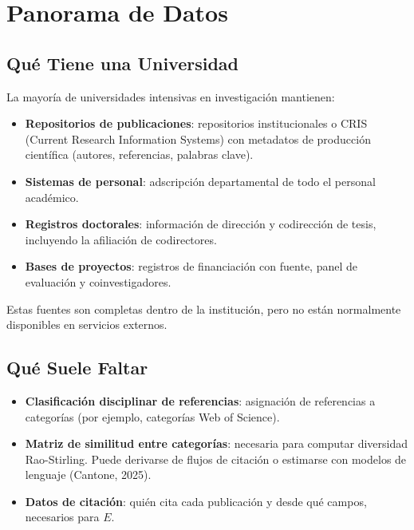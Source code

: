 \documentclass[
]{article}
\providecommand{\tightlist}{%
  \setlength{\itemsep}{0pt}\setlength{\parskip}{0pt}}
\begin{document}
\hypertarget{panorama-de-datos}{%
\section{Panorama de Datos}\label{panorama-de-datos}}

\hypertarget{quuxe9-tiene-una-universidad}{%
\subsection{Qué Tiene una
Universidad}\label{quuxe9-tiene-una-universidad}}

La mayoría de universidades intensivas en investigación mantienen:

\begin{itemize}
\tightlist
\item
  \textbf{Repositorios de publicaciones}: repositorios institucionales o
  CRIS (Current Research Information Systems) con metadatos de
  producción científica (autores, referencias, palabras clave).
\item
  \textbf{Sistemas de personal}: adscripción departamental de todo el
  personal académico.
\item
  \textbf{Registros doctorales}: información de dirección y codirección
  de tesis, incluyendo la afiliación de codirectores.
\item
  \textbf{Bases de proyectos}: registros de financiación con fuente,
  panel de evaluación y coinvestigadores.
\end{itemize}

Estas fuentes son completas dentro de la institución, pero no están
normalmente disponibles en servicios externos.

\hypertarget{quuxe9-suele-faltar}{%
\subsection{Qué Suele Faltar}\label{quuxe9-suele-faltar}}

\begin{itemize}
\tightlist
\item
  \textbf{Clasificación disciplinar de referencias}: asignación de
  referencias a categorías (por ejemplo, categorías Web of Science).
\item
  \textbf{Matriz de similitud entre categorías}: necesaria para computar
  diversidad Rao-Stirling. Puede derivarse de flujos de citación o
  estimarse con modelos de lenguaje (Cantone, 2025).
\item
  \textbf{Datos de citación}: quién cita cada publicación y desde qué
  campos, necesarios para \(E\).
\end{itemize}
\end{document}
